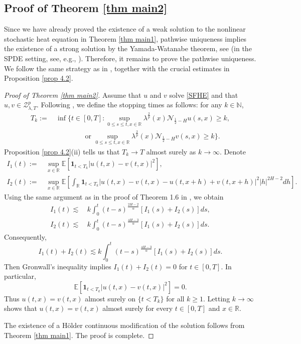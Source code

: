 \documentclass[11pt,reqno]{amsart}
\numberwithin{equation}{section}
\newcommand{\1}{{\bf 1}}
\newcommand{\2}{{\bf 2}}
\begin{document}
\subsection{Proof of Theorem \ref{thm main2}}
Since we have already proved the existence of a weak solution  to the nonlinear stochastic heat equation in  Theorem \ref{thm main1}, 
   pathwise uniqueness implies the existence  of a strong solution by the Yamada-Watanabe theorem, see \cite{IW1981} (in the SPDE setting, see, e.g., \cite{KS1991, Kurtz07}). Therefore,  it remains  to prove  the  pathwise uniqueness. We follow the same strategy as in  \cite{HHLNT2017, HW2022}, together with the crucial estimates in Proposition \ref{prop 4.2}. 
 
\begin{proof}[Proof of Theorem \ref{thm main2}]
Assume that $u$ and $v$ solve  \eqref{SFHE} and that  $u,v\in \mathcal{Z}_{\lambda,T}^p$.
Following \cite{HHLNT2017,HW2022},  we define the  stopping times as follows: for any $k\in \mathbb N$, 
\begin{align*}
T_k:=&\, \inf\Bigg\{t\in[0,T]:\sup_{0\le s\le t,x\in\mathbb{R}}\lambda^{\frac2p}(x)\mathcal{N}_{\frac12-H}u(s,x)\ge k, \\
&\, \,\,\,\,\,\,\,\,\,\, \,\,\,\,\,  \,\,\,\,\, \,\,\,\,\, \mbox{or } {\sup_{0\le s\le t,x\in\mathbb{R}}} \lambda^{\frac2p}(x)\mathcal{N}_{\frac12-H}v(s,x)\ge k\Bigg\}.
\end{align*}
Proposition \ref{prop 4.2}(ii) tells  us that $T_k\to T$ almost surely   as $k\to\infty$.  Denote
\begin{align*}
I_1(t):=&\, \sup_{x\in\mathbb{R}}\mathbb{E}\left[\textbf{1}_{t<T_k}|u(t,x)-v(t,x)|^2\right],\\
  I_2(t):=&\, \sup_{x\in\mathbb{R}}\mathbb{E}\left[\int_{\mathbb{R}}\textbf{1}_{t<T_k}|u(t,x)-v(t,x)-u(t,x+h)+v(t,x+h)|^2|h|^{2H-2}dh\right].
\end{align*}
 Using the same argument as in the proof of Theorem 1.6 in  \cite{HW2022}, we   obtain
\begin{align*}
I_1(t)\lesssim &\, k\int_0^t(t-s)^{\frac{2H-2}{\alpha}}\left[I_1(s)+I_2(s)\right]ds,\\
  I_2(t)\lesssim &\,  k\int_0^t(t-s)^{\frac{4H-3}{\alpha}}\left[I_1(s)+I_2(s)\right]ds.
\end{align*}
Consequently,
$$
I_1(t)+I_2(t)\lesssim k\int_0^t(t-s)^{\frac{4H-3}{\alpha}}\left[I_1(s)+I_2(s)\right]ds.
$$
Then Gronwall's inequality implies $I_1(t)+I_2(t)=0$ for $t\in[0,T]$. In particular,  
$$
\mathbb{E}\left[\textbf{1}_{t<T_k}|u(t,x)-v(t,x)|^2\right]=0.
$$
Thus $u(t,x)=v(t,x)$ almost surely on $\{t<T_k\}$ for all $k\ge1$.  Letting $k\to\infty$ shows that  $u(t,x)=v(t,x)$ almost surely for every $t\in[0,T]$ and $x\in\mathbb{R}$.

The existence of a H\"older continuous modification of the solution follows from Theorem \ref{thm main1}.  
   The proof is complete.
 \end{proof}
 
\end{document}
